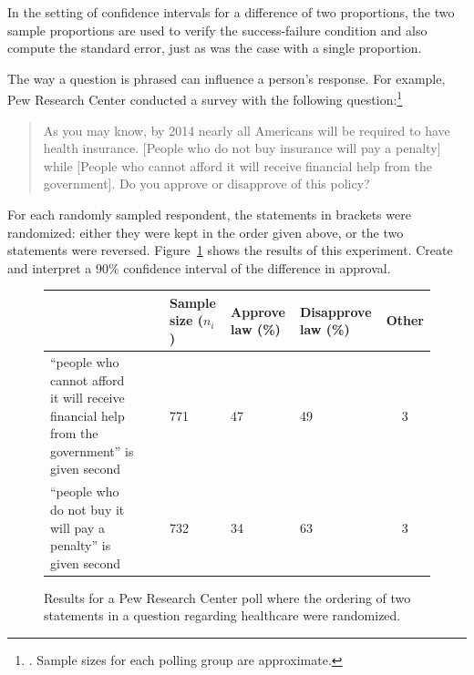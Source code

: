 In the setting of confidence intervals for a difference of two proportions, the two sample proportions are used to verify the success-failure condition and also compute the standard error, just as was the case with a single proportion.

\begin{example}{The way a question is phrased can influence a person's response. For example, Pew Research Center conducted a survey with the following question:\footnote{. Sample sizes for each polling group are approximate.}
\begin{quote}
As you may know, by 2014 nearly all Americans will be required to have health insurance. [People who do not buy insurance will pay a penalty] while [People who cannot afford it will receive financial help from the government]. Do you approve or disapprove of this policy?
\end{quote}
For each randomly sampled respondent, the statements in brackets were randomized: either they were kept in the order given above, or the two statements were reversed. Figure~\ref{pewPollResultsForRandomizedStatementOrdering} shows the results of this experiment. Create and interpret a 90\% confidence interval of the difference in approval.}

\begin{figure}[t]
\centering
\begin{tabular}{p{50mm}c p{13mm}p{14mm}p{16.5mm}c}
	&\ & Sample size ($n_i$) & Approve law (\%)	& Disapprove law (\%)	& Other \\
\hline
``people who cannot afford it will receive financial help from the government'' is given second \vspace{2.5mm}
	& & 771	& 47	& 49	& 3 \\
``people who do not buy it will pay a penalty'' is given second
	& & 732	& 34	& 63	& 3 \\
\hline
\end{tabular}
\caption{Results for a Pew Research Center poll where the ordering of two statements in a question regarding healthcare were randomized.}
\label{pewPollResultsForRandomizedStatementOrdering}
\end{figure}


\end{example}
